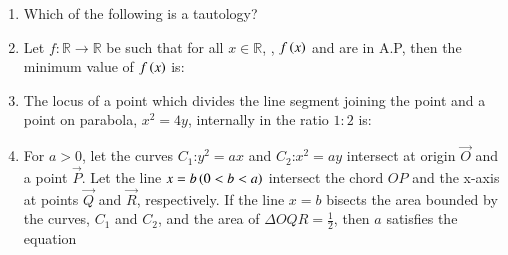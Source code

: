 \documentclass[journal,12pt,onecolumn]{IEEEtran}
\theoremstyle{remark}
\begin{document}
\begin{enumerate}
\item Which of the following is a tautology?

\hfill{}
\begin{enumerate}
\end{enumerate}

\item Let $f:\mathbb{R}\rightarrow\mathbb{R}$ be such that for all $x\in\mathbb{R}$, , $f\left(x\right)$ and  are in A.P, then the minimum value of $f\left(x\right)$ is:

\hfill{}
\begin{enumerate}
\end{enumerate}

\item The locus of a point which divides the line segment joining the point  and a point on parabola, $x^2 = 4y$, internally in the ratio $1:2$ is:

\hfill{}
\begin{enumerate}
\end{enumerate}

\item For $a>0$, let the curves $C_1$:$y^2=ax$ and $C_2$:$x^2=ay$ intersect at origin $\vec{O}$ and a point $\vec{P}$. Let the line $x=b\left(0<b<a\right)$ intersect the chord $OP$ and the x-axis at points $\vec{Q}$ and $\vec{R}$, respectively. If the line $x=b$ bisects the area bounded by the curves, $C_1$ and $C_2$, and the area of $\Delta OQR = \frac{1}{2}$, then $a$ satisfies the equation


\end{enumerate}
\end{document}
